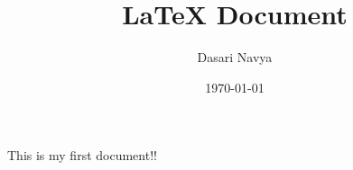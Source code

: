 \documentclass{article}
\title{LaTeX Document}
\author{Dasari Navya}
\date{\today}
\begin{document}
	\maketitle
This is my first document!!
\end{document}
